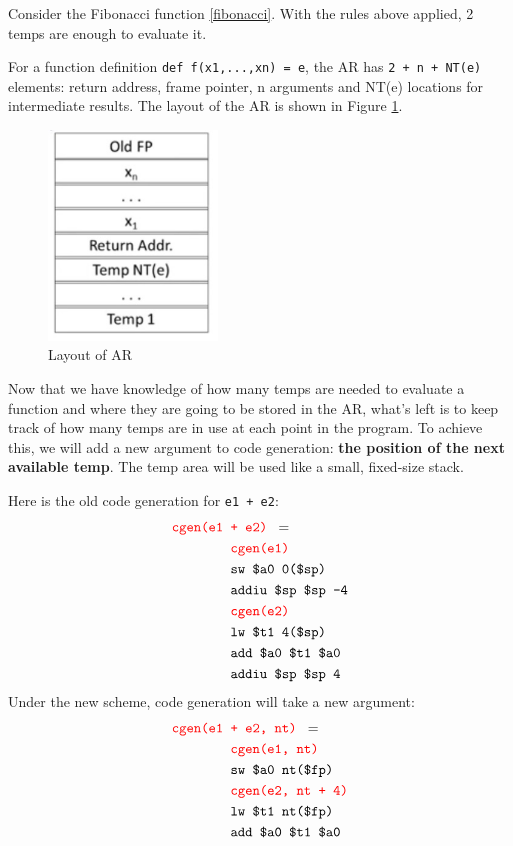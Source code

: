 Consider the Fibonacci function \eqref{fibonacci}. With the rules above applied, 2 temps are enough to evaluate it.

For a function definition \texttt{def f(x1,...,xn) = e}, the AR has \texttt{2 + n + NT(e)} elements: return address, frame pointer, n arguments and NT(e) locations for intermediate results. The layout of the AR is shown in Figure 
\ref{arlayout}.
\begin{figure}[ht]
\centering
\includegraphics[width = 0.4\textwidth]{arlayout.jpg}
\caption{Layout of AR}\label{arlayout}
\end{figure}

Now that we have knowledge of how many temps are needed to evaluate a function and where they are going to be stored in the AR, what's left is to keep track of how many temps are in use at each point in the program. To achieve this, we will add a new argument to code generation: \textbf{the position of the next available temp}. The temp area will be used like a small, fixed-size stack. 

Here is the old code generation for \texttt{e1 + e2}:
\begin{align*}
\texttt{\color{red}cgen(e1 }&\texttt{\color{red}+ e2) }=\\
&\texttt{\color{red}cgen(e1)}\\
&\texttt{sw \$a0 0(\$sp)}\\
&\texttt{addiu \$sp \$sp -4}\\
&\texttt{\color{red} cgen(e2)}\\
&\texttt{lw \$t1 4(\$sp)}\\
&\texttt{add \$a0 \$t1 \$a0}\\
&\texttt{addiu \$sp \$sp 4}
\end{align*}
Under the new scheme, code generation will take a new argument:
\begin{align*}
\texttt{\color{red}cgen(e1 }&\texttt{\color{red}+ e2, nt) }=\\
&\texttt{\color{red}cgen(e1, nt)}\\
&\texttt{sw \$a0 nt(\$fp)}\\
&\texttt{\color{red} cgen(e2, nt + 4)}\\
&\texttt{lw \$t1 nt(\$fp)}\\
&\texttt{add \$a0 \$t1 \$a0}\\
\end{align*}
